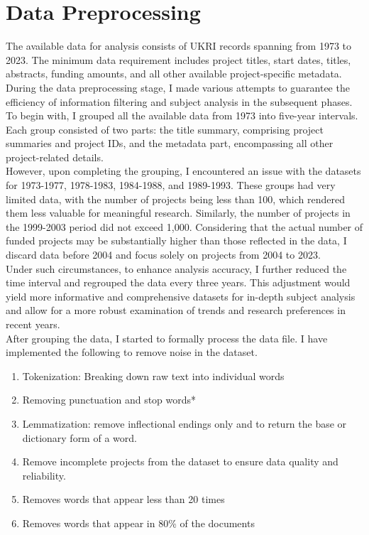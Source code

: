 \documentclass[12pt,twoside]{report}
\begin{document}
\section*{Data Preprocessing}
The available data for analysis consists of UKRI records spanning from 1973 to 2023. The minimum data requirement includes project titles, start dates, titles, abstracts, funding amounts, and all other available project-specific metadata. \\

During the data preprocessing stage, I made various attempts to guarantee the efficiency of information filtering and subject analysis in the subsequent phases. To begin with, I grouped all the available data from 1973 into five-year intervals. Each group consisted of two parts: the title summary, comprising project summaries and project IDs, and the metadata part, encompassing all other project-related details.\\

However, upon completing the grouping, I encountered an issue with the datasets for 1973-1977, 1978-1983, 1984-1988, and 1989-1993. These groups had very limited data, with the number of projects being less than 100, which rendered them less valuable for meaningful research. Similarly, the number of projects in the 1999-2003 period did not exceed 1,000. Considering that the actual number of funded projects may be substantially higher than those reflected in the data, I discard data before 2004 and focus solely on projects from 2004 to 2023.\\

Under such circumstances, to enhance analysis accuracy, I further reduced the time interval and regrouped the data every three years. This adjustment would yield more informative and comprehensive datasets for in-depth subject analysis and allow for a more robust examination of trends and research preferences in recent years.\\

After grouping the data, I started to formally process the data file. I have implemented the following to remove noise in the dataset.

\begin{enumerate}
  \item Tokenization: Breaking down raw text into individual words
  \item Removing punctuation and stop words*
  \item Lemmatization: remove inflectional endings only and to return the base or dictionary form of a word.\cite{kurt2020topic}
  \item Remove incomplete projects from the dataset to ensure data quality and reliability.
  \item Removes words that appear less than 20 times
  \item Removes words that appear in 80\% of the documents
\end{enumerate}
\end{document}
